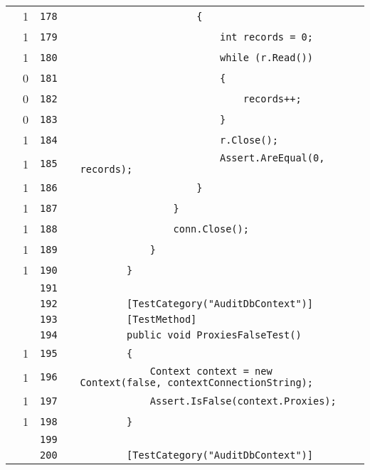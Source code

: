 \documentclass[a4paper,10pt]{article}
\begin{document}
\begin{longtable}[l]{lrrll}
\cellcolor{green} & 1 & \verb~178~ & & \verb~                    {~\\
\cellcolor{green} & 1 & \verb~179~ & & \verb~                        int records = 0;~\\
\cellcolor{green} & 1 & \verb~180~ & & \verb~                        while (r.Read())~\\
\cellcolor{red} & 0 & \verb~181~ & & \verb~                        {~\\
\cellcolor{red} & 0 & \verb~182~ & & \verb~                            records++;~\\
\cellcolor{red} & 0 & \verb~183~ & & \verb~                        }~\\
\cellcolor{green} & 1 & \verb~184~ & & \verb~                        r.Close();~\\
\cellcolor{green} & 1 & \verb~185~ & & \verb~                        Assert.AreEqual(0, records);~\\
\cellcolor{green} & 1 & \verb~186~ & & \verb~                    }~\\
\cellcolor{green} & 1 & \verb~187~ & & \verb~                }~\\
\cellcolor{green} & 1 & \verb~188~ & & \verb~                conn.Close();~\\
\cellcolor{green} & 1 & \verb~189~ & & \verb~            }~\\
\cellcolor{green} & 1 & \verb~190~ & & \verb~        }~\\
\cellcolor{gray} &  & \verb~191~ & & \verb~~\\
\cellcolor{gray} &  & \verb~192~ & & \verb~        [TestCategory("AuditDbContext")]~\\
\cellcolor{gray} &  & \verb~193~ & & \verb~        [TestMethod]~\\
\cellcolor{gray} &  & \verb~194~ & & \verb~        public void ProxiesFalseTest()~\\
\cellcolor{green} & 1 & \verb~195~ & & \verb~        {~\\
\cellcolor{green} & 1 & \verb~196~ & & \verb~            Context context = new Context(false, contextConnectionString);~\\
\cellcolor{green} & 1 & \verb~197~ & & \verb~            Assert.IsFalse(context.Proxies);~\\
\cellcolor{green} & 1 & \verb~198~ & & \verb~        }~\\
\cellcolor{gray} &  & \verb~199~ & & \verb~~\\
\cellcolor{gray} &  & \verb~200~ & & \verb~        [TestCategory("AuditDbContext")]~\\

\end{longtable}
\end{document}

